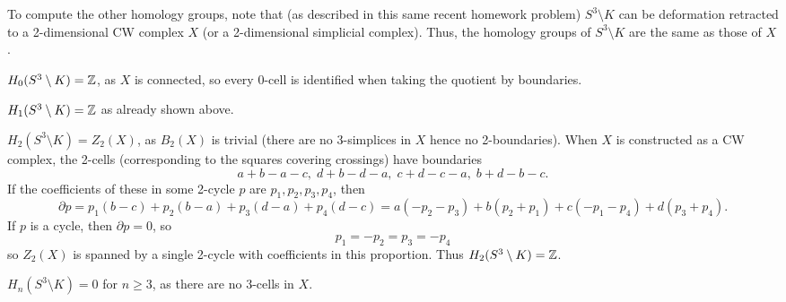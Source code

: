 \documentclass{amsart}
\begin{document}
	 To compute the other homology groups, note that (as described in this same recent homework problem) $S^3\setminus K$ can be deformation retracted to a 2-dimensional CW complex $X$ (or a 2-dimensional simplicial complex). Thus, the homology groups of $S^3\setminus K$ are the same as those of $X$. 
	 
	 $H_0(S^3\setminus K)=\mathbb{Z}$, as $X$ is connected, so every $0$-cell is identified when taking the quotient by boundaries. 
	 
	 $H_1(S^3\setminus K)=\mathbb{Z}$ as already shown above. 
	 
	 $H_2(S^3\setminus K)=Z_2(X)$, as $B_2(X)$ is trivial (there are no 3-simplices in $X$ hence no 2-boundaries). When $X$ is constructed as a CW complex, the 2-cells (corresponding to the squares covering crossings) have boundaries 
	 $$
	 a + b - a - c, \; d + b - d - a, \; c + d - c - a,\; b + d - b - c.
	 $$
	 If the coefficients of these in some 2-cycle $p$ are $p_1,p_2,p_3,p_4$, then 
	 $$
	 \partial p = p_1(b-c) + p_2(b-a) + p_3(d-a) + p_4(d-c) = a(-p_2-p_3) + b(p_2+p_1) + c(-p_1-p_4) + d(p_3+p_4).
	 $$
	 If $p$ is a cycle, then $\partial p =0$, so 
	 $$
	 p_1 = -p_2 = p_3 = -p_4
	 $$
	 so $Z_2(X)$ is spanned by a single 2-cycle with coefficients in this proportion. Thus $H_2(S^3\setminus K)=\mathbb{Z}$.
	 
	 
	 
	 $H_n(S^3\setminus K)=0$ for $n\geq 3$, as there are no $3$-cells in $X$.
	 
\end{document}
